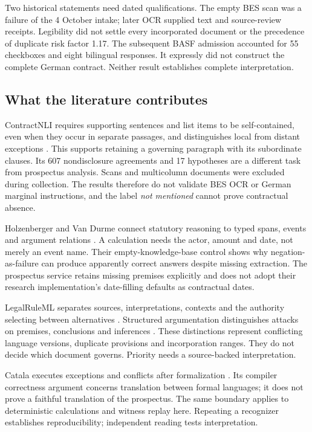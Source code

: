 Two historical statements need dated qualifications. The empty BES scan was a
failure of the 4 October intake; later OCR supplied text and source-review
receipts. Legibility did not settle every incorporated document or the precedence
of duplicate risk factor 1.17. The subsequent BASF admission accounted for 55
checkboxes and eight bilingual responses. It expressly did not construct the
complete German contract. Neither result establishes complete interpretation.

\subsection{What the literature contributes}

ContractNLI requires supporting sentences and list items to be self-contained,
even when they occur in separate passages, and distinguishes local from distant
exceptions \cite[Sections 2--5 and Appendix A.1]{contractnli2021}. This supports
retaining a governing paragraph with its subordinate clauses. Its 607
nondisclosure agreements and 17 hypotheses are a different task from prospectus
analysis. Scans and multicolumn documents were excluded during collection.
The results therefore do not validate BES OCR or German marginal instructions,
and the label \emph{not mentioned} cannot prove contractual absence.

Holzenberger and Van Durme connect statutory reasoning to typed spans, events
and argument relations \cite[Sections 3--5 and Appendices B, D and E]{connecting2023}.
A calculation needs the actor, amount and date, not merely an event name.
Their empty-knowledge-base control shows why negation-as-failure can produce
apparently correct answers despite missing extraction. The prospectus service
retains missing premises explicitly and does not adopt their research
implementation's date-filling defaults as contractual dates.

LegalRuleML separates sources, interpretations, contexts and the authority
selecting between alternatives \cite[Sections 3--4]{legalinterpretations2014}.
Structured argumentation distinguishes attacks on premises, conclusions and
inferences \cite[Sections 3 and 6]{aspic2010}. These distinctions represent
conflicting language versions, duplicate provisions and incorporation ranges.
They do not decide which document governs. Priority needs a source-backed
interpretation.

Catala executes exceptions and conflicts after formalization
\cite[Sections 4.1, 4.4--4.5 and 6.1]{catala2021}. Its compiler correctness
argument concerns translation between formal languages; it does not prove a
faithful translation of the prospectus. The same boundary applies to
deterministic calculations and witness replay here. Repeating a recognizer
establishes reproducibility; independent reading tests interpretation.

